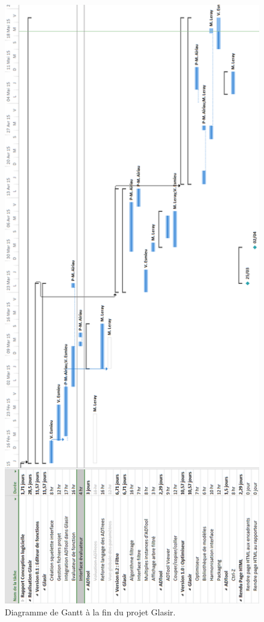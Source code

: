     \begin{figure}[H]
        \centering
        \includegraphics[height=1.6\textwidth]{figure/planification.png}
        \caption{Diagramme de Gantt à la fin du projet Glasir.}
        \label{fig:planif}
    \end{figure}





